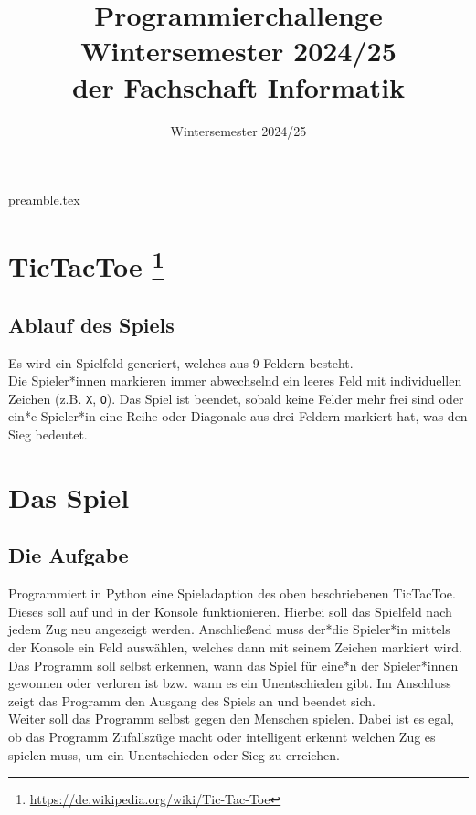 \RequirePackage{import}
{preamble.tex}
\usepackage[T1]{fontenc}
\usepackage[utf8]{inputenc}
\usepackage[ngerman]{babel}
\usepackage{hyperref}
\usepackage{ifthen}
\usepackage{listings}
\usepackage{graphicx}
\usepackage{multicol}
\usepackage{multirow}

\setlength{\parindent}{0pt}


\title{Programmierchallenge Wintersemester 2024/25 \\ {\small der Fachschaft Informatik}}
\subtitle{Wintersemester 2024/25}
\maketitle

\section*{TicTacToe \footnote[1]{\url{https://de.wikipedia.org/wiki/Tic-Tac-Toe}}}
\subsection*{Ablauf des Spiels}
Es wird ein Spielfeld generiert, welches aus 9 Feldern besteht. \\

Die Spieler*innen markieren immer abwechselnd ein leeres Feld mit individuellen Zeichen (z.B. \texttt{X}, \texttt{O}). Das Spiel ist beendet, sobald keine Felder mehr frei sind oder ein*e Spieler*in eine Reihe oder Diagonale aus drei Feldern markiert hat, was den Sieg bedeutet. \\


\section*{Das Spiel}
\subsection*{Die Aufgabe}
Programmiert in Python eine Spieladaption des oben beschriebenen TicTacToe. Dieses soll auf und in der Konsole funktionieren. Hierbei soll das Spielfeld nach jedem Zug neu angezeigt werden. Anschließend muss der*die Spieler*in mittels der Konsole ein Feld auswählen, welches dann mit seinem Zeichen markiert wird. \\
Das Programm soll selbst erkennen, wann das Spiel für eine*n der Spieler*innen gewonnen oder verloren ist bzw. wann es ein Unentschieden gibt. Im Anschluss zeigt das Programm den Ausgang des Spiels an und beendet sich. \\
Weiter soll das Programm selbst gegen den Menschen spielen. Dabei ist es egal, ob das Programm Zufallszüge macht oder intelligent erkennt welchen Zug es spielen muss, um ein Unentschieden oder Sieg zu erreichen.


